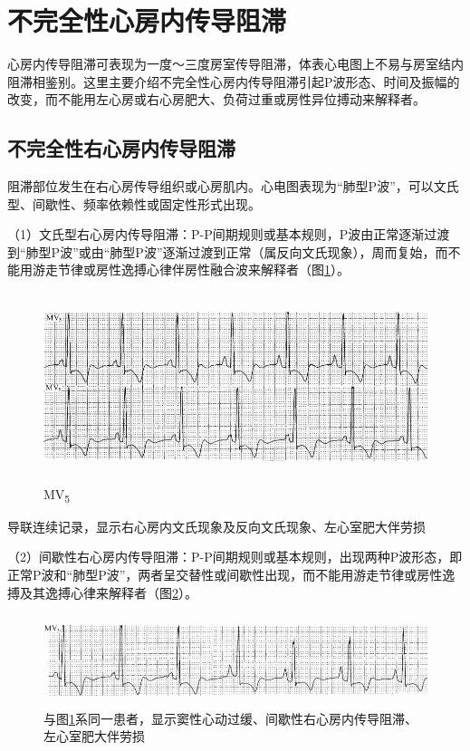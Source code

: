 \protect\hypertarget{text00026.htmlux5cux23subid314}{}{}

\section{不完全性心房内传导阻滞}

心房内传导阻滞可表现为一度～三度房室传导阻滞，体表心电图上不易与房室结内阻滞相鉴别。这里主要介绍不完全性心房内传导阻滞引起P波形态、时间及振幅的改变，而不能用左心房或右心房肥大、负荷过重或房性异位搏动来解释者。

\protect\hypertarget{text00026.htmlux5cux23subid315}{}{}

\subsection{不完全性右心房内传导阻滞}

阻滞部位发生在右心房传导组织或心房肌内。心电图表现为“肺型P波”，可以文氏型、间歇性、频率依赖性或固定性形式出现。

（1）文氏型右心房内传导阻滞：P-P间期规则或基本规则，P波由正常逐渐过渡到“肺型P波”或由“肺型P波”逐渐过渡到正常（属反向文氏现象），周而复始，而不能用游走节律或房性逸搏心律伴房性融合波来解释者（图\ref{fig19-1}）。

\begin{figure}[!htbp]
 \centering
 \includegraphics[width=5.58333in,height=2.17708in]{./images/Image00317.jpg}
 \captionsetup{justification=centering}
 \caption{MV\textsubscript{5}}
 \label{fig19-1}
  \end{figure} 
导联连续记录，显示右心房内文氏现象及反向文氏现象、左心室肥大伴劳损

（2）间歇性右心房内传导阻滞：P-P间期规则或基本规则，出现两种P波形态，即正常P波和“肺型P波”，两者呈交替性或间歇性出现，而不能用游走节律或房性逸搏及其逸搏心律来解释者（图\ref{fig19-2}）。

\begin{figure}[!htbp]
 \centering
 \includegraphics[width=5.66667in,height=1.05208in]{./images/Image00318.jpg}
 \captionsetup{justification=centering}
 \caption{与图\ref{fig19-1}系同一患者，显示窦性心动过缓、间歇性右心房内传导阻滞、左心室肥大伴劳损}
 \label{fig19-2}
  \end{figure} 

